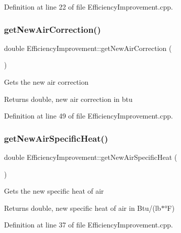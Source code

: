 Definition at line 22 of file Efficiency\+Improvement.\+cpp.

\mbox{\label{class_efficiency_improvement_a0339daa6d9cfc25e8da4f9efef73b3d8}} 
\subsubsection{\texorpdfstring{get\+New\+Air\+Correction()}{getNewAirCorrection()}}
{\footnotesize\ttfamily double Efficiency\+Improvement\+::get\+New\+Air\+Correction (\begin{DoxyParamCaption}{ }\end{DoxyParamCaption})}

Gets the new air correction

\begin{DoxyReturn}{Returns}
double, new air correction in btu 
\end{DoxyReturn}


Definition at line 49 of file Efficiency\+Improvement.\+cpp.

\mbox{\label{class_efficiency_improvement_a71ab10ba190cb99edb85fcd7f679e721}} 
\subsubsection{\texorpdfstring{get\+New\+Air\+Specific\+Heat()}{getNewAirSpecificHeat()}}
{\footnotesize\ttfamily double Efficiency\+Improvement\+::get\+New\+Air\+Specific\+Heat (\begin{DoxyParamCaption}{ }\end{DoxyParamCaption})}

Gets the new specific heat of air

\begin{DoxyReturn}{Returns}
double, new specific heat of air in Btu/(lb$\ast$°F) 
\end{DoxyReturn}


Definition at line 37 of file Efficiency\+Improvement.\+cpp.

